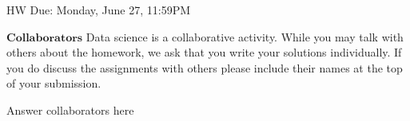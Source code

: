 \documentclass[11pt]{article}
\begin{document}
\maketitle
\fontsize{12}{15}\selectfont

\begin{center}
    HW Due: Monday, June 27, 11:59PM
\end{center}
    
    $\textbf{Collaborators}$
    Data science is a collaborative activity. While you may talk with others about the homework, we ask that you write your solutions individually. If you do discuss the assignments with others please include their names at the top of your submission.
        \begin{Answer}
            Answer collaborators here
        \end{Answer}
        
\end{document}

